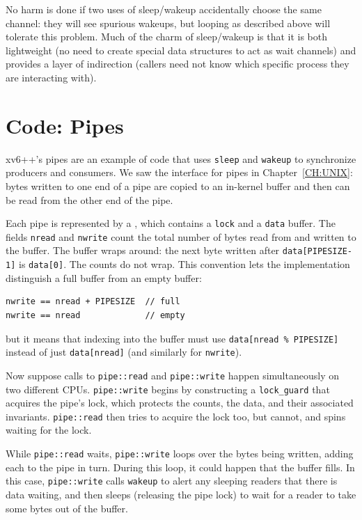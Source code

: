 No harm is done if two uses of sleep/wakeup accidentally
choose the same channel: they will see spurious wakeups,
but looping as described above will tolerate this problem.
Much of the charm of sleep/wakeup is that it is both
lightweight (no need to create special data
structures to act as wait channels) and provides a layer
of indirection (callers need not know which specific process
they are interacting with).

\section{Code: Pipes}

xv6++'s pipes are an example of code that uses
\lstinline{sleep}
and \lstinline{wakeup} to synchronize producers and
consumers.
We saw the interface for pipes in Chapter~\ref{CH:UNIX}:
bytes written to one end of a pipe are copied
to an in-kernel buffer and then can be read from
the other end of the pipe.

Each pipe
is represented by a
,
which contains
a
\lstinline{lock}
and a
\lstinline{data}
buffer.
The fields
\lstinline{nread}
and
\lstinline{nwrite}
count the total number of bytes read from
and written to the buffer.
The buffer wraps around:
the next byte written after
\lstinline{data[PIPESIZE-1]}
is
\lstinline{data[0]}.
The counts do not wrap.
This convention lets the implementation
distinguish a full buffer from an empty buffer:
\begin{lstlisting}
nwrite == nread + PIPESIZE  // full
nwrite == nread             // empty
\end{lstlisting}
but it means that indexing into the buffer
must use
\lstinline{data[nread % PIPESIZE]}
instead of just
\lstinline{data[nread]}
(and similarly for
\lstinline{nwrite}).

Now suppose calls to
\lstinline{pipe::read}
and
\lstinline{pipe::write}
happen simultaneously on two different CPUs.
\lstinline{pipe::write}
begins by constructing a
\lstinline{lock_guard}
that acquires the pipe's lock, which
protects the counts, the data, and their
associated invariants.
\lstinline{pipe::read}
then tries to acquire the lock too, but cannot,
and spins waiting for the lock.

While
\lstinline{pipe::read}
waits,
\lstinline{pipe::write}
loops over the bytes being written,
adding each to the pipe in turn.
During this loop, it could happen that
the buffer fills.
In this case,
\lstinline{pipe::write}
calls
\lstinline{wakeup}
to alert any sleeping readers that there is data waiting,
and then sleeps (releasing the pipe lock) to wait for a reader
to take some bytes out of the buffer.

